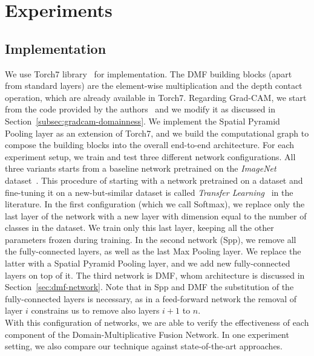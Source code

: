 \documentclass[../main.tex]{subfiles}
\begin{document}
    \chapter{Experiments}\label{chap:experiments}

    \section{Implementation}\label{sec:implementation}
    We use Torch7 library~\cite{torch7} for implementation. The DMF building blocks (apart from standard layers) are the
    element-wise multiplication and the depth contact operation, which are already available in Torch7.
    Regarding Grad-CAM, we start from the code provided by the authors~\cite{gradcam-github} and we modify it as discussed
    in Section~\ref{subsec:gradcam-domainness}.
    We implement the Spatial Pyramid Pooling layer as an extension of Torch7, and we build the computational graph to compose
    the building blocks into the overall end-to-end architecture.
    \newline\newline
    For each experiment setup, we train and test three different network configurations. All three variants starts from a baseline network pretrained on
    the \textit{ImageNet} dataset~\cite{imagenet}.
    This procedure of starting with a network pretrained on a dataset and fine-tuning it on a new-but-similar dataset is called
    \textit{Transfer Learning}~\cite{transfer-learning} in the literature.
    In the first configuration (which we call Softmax), we replace only the last layer of the network with a new layer
    with dimension equal to the number of classes in the dataset. We train only this last layer, keeping all the other parameters frozen during training.
    In the second network (Spp), we remove all the fully-connected layers, as well as the last Max Pooling layer.
    We replace the latter with a Spatial Pyramid Pooling layer, and we add new fully-connected layers on top of it.
    The third network is DMF, whom architecture is discussed in Section~\ref{sec:dmf-network}. Note that in Spp and DMF the substitution of
    the fully-connected layers is necessary, as in a feed-forward network the removal of layer $i$ constrains us to remove also layers $i + 1$ to $n$.
    \\
    With this configuration of networks, we are able to verify the
    effectiveness of each component of the Domain-Multiplicative Fusion Network. In one experiment setting, we also compare our technique
    against state-of-the-art approaches.
\end{document}
